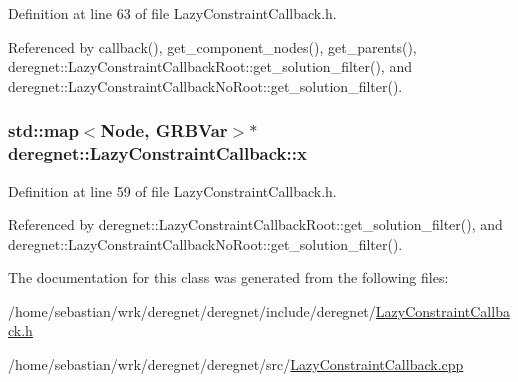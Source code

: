 Definition at line 63 of file Lazy\+Constraint\+Callback.\+h.



Referenced by callback(), get\+\_\+component\+\_\+nodes(), get\+\_\+parents(), deregnet\+::\+Lazy\+Constraint\+Callback\+Root\+::get\+\_\+solution\+\_\+filter(), and deregnet\+::\+Lazy\+Constraint\+Callback\+No\+Root\+::get\+\_\+solution\+\_\+filter().

\subsubsection[{\texorpdfstring{x}{x}}]{\setlength{\rightskip}{0pt plus 5cm}std\+::map$<${\bf Node}, G\+R\+B\+Var$>$$\ast$ deregnet\+::\+Lazy\+Constraint\+Callback\+::x\hspace{0.3cm}{\ttfamily [protected]}}\hypertarget{classderegnet_1_1LazyConstraintCallback_a48d0e4065232a6dca6e10fe416be755f}{}\label{classderegnet_1_1LazyConstraintCallback_a48d0e4065232a6dca6e10fe416be755f}


Definition at line 59 of file Lazy\+Constraint\+Callback.\+h.



Referenced by deregnet\+::\+Lazy\+Constraint\+Callback\+Root\+::get\+\_\+solution\+\_\+filter(), and deregnet\+::\+Lazy\+Constraint\+Callback\+No\+Root\+::get\+\_\+solution\+\_\+filter().



The documentation for this class was generated from the following files\+:\begin{DoxyCompactItemize}
\item 
/home/sebastian/wrk/deregnet/deregnet/include/deregnet/\hyperlink{LazyConstraintCallback_8h}{Lazy\+Constraint\+Callback.\+h}\item 
/home/sebastian/wrk/deregnet/deregnet/src/\hyperlink{LazyConstraintCallback_8cpp}{Lazy\+Constraint\+Callback.\+cpp}\end{DoxyCompactItemize}

